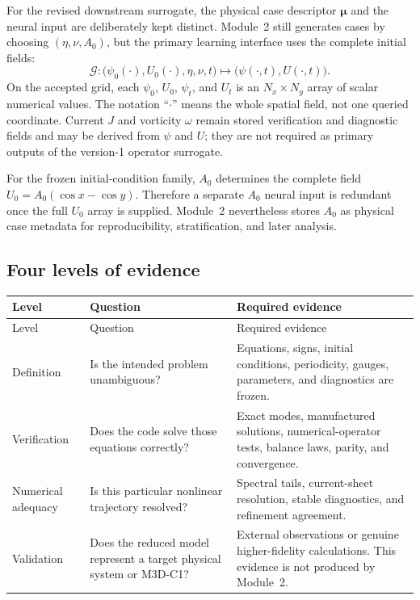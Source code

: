 \documentclass[11pt]{article}
\newcommand{\vect}[1]{\bm{#1}}
\begin{document}
For the revised downstream surrogate, the physical case descriptor $\vect{\mu}$ and the neural input are deliberately kept distinct. Module~2 still generates cases by choosing $(\eta,\nu,A_0)$, but the primary learning interface uses the complete initial fields:
\begin{equation}
\boxed{
\mathcal{G}:
\bigl(\psi_0(\cdot),U_0(\cdot),\eta,\nu,t\bigr)
\longmapsto
\bigl(\psi(\cdot,t),U(\cdot,t)\bigr).}
\label{eq:operator_map}
\end{equation}
On the accepted grid, each $\psi_0$, $U_0$, $\psi_t$, and $U_t$ is an $N_x\times N_y$ array of scalar numerical values. The notation ``$\cdot$'' means the whole spatial field, not one queried coordinate. Current $J$ and vorticity $\omega$ remain stored verification and diagnostic fields and may be derived from $\psi$ and $U$; they are not required as primary outputs of the version-1 operator surrogate.

For the frozen initial-condition family, $A_0$ determines the complete field $U_0=A_0(\cos x-\cos y)$. Therefore a separate $A_0$ neural input is redundant once the full $U_0$ array is supplied. Module~2 nevertheless stores $A_0$ as physical case metadata for reproducibility, stratification, and later analysis.

\subsection{Four levels of evidence}

\begin{longtable}{p{}p{}p{}}
\toprule
Level & Question & Required evidence \\
\midrule
\endfirsthead
\toprule
Level & Question & Required evidence \\
\midrule
\endhead
Definition & Is the intended problem unambiguous? & Equations, signs, initial conditions, periodicity, gauges, parameters, and diagnostics are frozen. \\
Verification & Does the code solve those equations correctly? & Exact modes, manufactured solutions, numerical-operator tests, balance laws, parity, and convergence. \\
Numerical adequacy & Is this particular nonlinear trajectory resolved? & Spectral tails, current-sheet resolution, stable diagnostics, and refinement agreement. \\
Validation & Does the reduced model represent a target physical system or M3D-C1? & External observations or genuine higher-fidelity calculations. This evidence is not produced by Module~2. \\
\bottomrule
\end{longtable}
\end{document}
